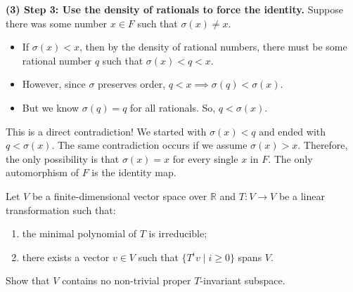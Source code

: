 \begin{solution}
\textbf{(3) Step 3: Use the density of rationals to force the identity.}
Suppose there was some number $x \in F$ such that $\sigma(x) \neq x$. 
\begin{itemize}
    \item If $\sigma(x) < x$, then by the density of rational numbers, there must be some rational number $q$ such that $\sigma(x) < q < x$.
    \item However, since $\sigma$ preserves order, $q < x \implies \sigma(q) < \sigma(x)$.
    \item But we know $\sigma(q) = q$ for all rationals. So, $q < \sigma(x)$.
\end{itemize}
This is a direct contradiction! We started with $\sigma(x) < q$ and ended with $q < \sigma(x)$.
The same contradiction occurs if we assume $\sigma(x) > x$.
Therefore, the only possibility is that $\sigma(x) = x$ for every single $x$ in $F$. The only automorphism of $F$ is the identity map.
\end{solution}

\begin{exercise}
\label{algebra:2011:4}
Let $V$ be a finite-dimensional vector space over $\mathbb{R}$ and $T: V \to V$ be a linear transformation such that:
\begin{enumerate}
    \item the minimal polynomial of $T$ is irreducible;
    \item there exists a vector $v \in V$ such that $\{ T^i v \mid i \geq 0 \}$ spans $V$.
\end{enumerate}
Show that $V$ contains no non-trivial proper $T$-invariant subspace.
\end{exercise}

